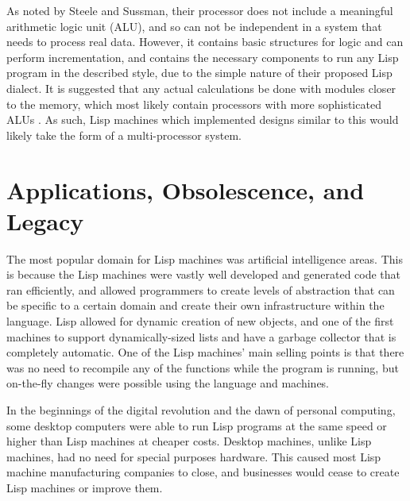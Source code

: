\documentclass[journal]{IEEEtran}
\begin{document}
As noted by Steele and Sussman, their processor does not include a meaningful arithmetic logic unit (ALU), and so can not be independent in a system that needs to process real data. However, it contains basic structures for logic and can perform incrementation, and contains the necessary components to run any Lisp program in the described style, due to the simple nature of their proposed Lisp dialect. It is suggested that any actual calculations be done with modules closer to the memory, which most likely contain processors with more sophisticated ALUs \cite{ss}. As such, Lisp machines which implemented designs similar to this would likely take the form of a multi-processor system.

\section{Applications, Obsolescence, and Legacy}
The most popular domain for Lisp machines was  artificial intelligence areas.  This is because the Lisp machines were vastly well developed and generated code that ran efficiently, and allowed programmers to create levels of abstraction that can be specific to a certain domain and create their own infrastructure within the language. Lisp allowed for dynamic creation of new objects, and one of the first machines to support dynamically-sized lists and have a garbage collector that is completely automatic. One of the Lisp machines' main selling points is that there was no need to recompile any of the functions while the program is running, but on-the-fly changes were possible using the language and machines.

In the beginnings of the digital revolution and the dawn of personal computing, some desktop computers were able to run Lisp programs at the same speed or higher than Lisp machines at cheaper costs. Desktop machines, unlike Lisp machines, had no need for special purposes hardware. This caused most Lisp machine manufacturing companies to close, and businesses would cease to create Lisp machines or improve them.


%
%
\end{document}

